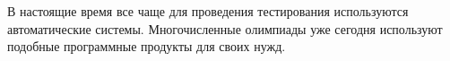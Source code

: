 \Introduction

В настоящие время все чаще для проведения тестирования используются автоматические системы. Многочисленные олимпиады уже сегодня используют подобные программные продукты для своих нужд.